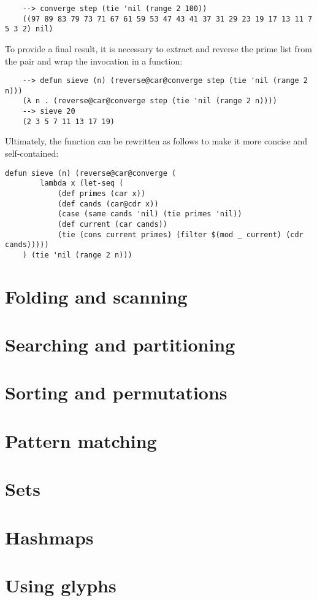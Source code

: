 \begin{Verbatim}
    --> converge step (tie 'nil (range 2 100))
    ((97 89 83 79 73 71 67 61 59 53 47 43 41 37 31 29 23 19 17 13 11 7 5 3 2) nil)
\end{Verbatim}

To provide a final result, it is necessary to extract and reverse the prime list from the pair and wrap the invocation in a function:

\begin{Verbatim}
    --> defun sieve (n) (reverse@car@converge step (tie 'nil (range 2 n)))
    (λ n . (reverse@car@converge step (tie 'nil (range 2 n))))
    --> sieve 20
    (2 3 5 7 11 13 17 19)
\end{Verbatim}

Ultimately, the function can be rewritten as follows to make it more concise and self-contained:

\begin{Verbatim}
defun sieve (n) (reverse@car@converge (
        lambda x (let-seq (
            (def primes (car x))
            (def cands (car@cdr x))
            (case (same cands 'nil) (tie primes 'nil))
            (def current (car cands))
            (tie (cons current primes) (filter $(mod _ current) (cdr cands)))))
    ) (tie 'nil (range 2 n)))
\end{Verbatim}

\section{Folding and scanning}

\section{Searching and partitioning}

\section{Sorting and permutations}

\section{Pattern matching}

\section{Sets}

\section{Hashmaps}

\section{Using glyphs}
